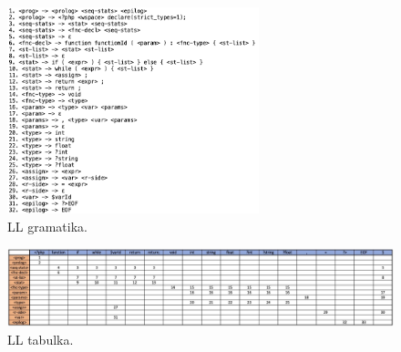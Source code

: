\documentclass[a4paper, 12pt]{article}
\begin{document}
    \begin{figure}[H]
        \includegraphics[width=0.65\textwidth]{src/LL-gramatika.png}
        \caption{LL gramatika.}
        \label{LL gramatika}
    \end{figure}

    \begin{figure}[H]
        \hspace*{-1cm}
        \centering
        \includegraphics[width= 0.90 \paperwidth]{src/LL-tabulka.png}
        \caption{LL tabulka.}
        \label{LL tabulka}
    \end{figure}
\end{document}
